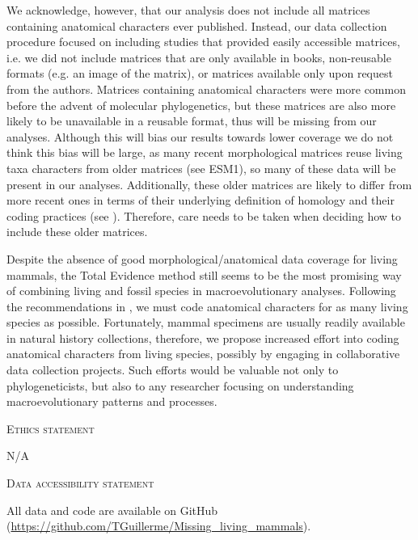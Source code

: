 \documentclass[12pt,letterpaper]{article}
\renewcommand{\section}[1]{%
\bigskip
\begin{center}
\begin{Large}
\normalfont\scshape #1
\medskip
\end{Large}
\end{center}}
\begin{document}
We acknowledge, however, that our analysis does not include all matrices containing anatomical characters ever published.
Instead, our data collection procedure focused on including studies that provided easily accessible matrices, i.e. we did not include matrices that are only available in books, non-reusable formats (e.g. an image of the matrix), or matrices available only upon request from the authors.
Matrices containing anatomical characters were more common before the advent of molecular phylogenetics, but these matrices are also more likely to be unavailable in a reusable format, thus will be missing from our analyses.
Although this will bias our results towards lower coverage we do not think this bias will be large, as many recent morphological matrices reuse living taxa characters from older matrices (see ESM1), so many of these data will be present in our analyses.
Additionally, these older matrices are likely to differ from more recent ones in terms of their underlying definition of homology and their coding practices (see \cite{Brazeau2011}).
Therefore, care needs to be taken when deciding how to include these older matrices.

Despite the absence of good morphological/anatomical data coverage for living mammals, the Total Evidence method still seems to be the most promising way of combining living and fossil species in macroevolutionary analyses.
Following the recommendations in \cite{GuillermeCooper}, we must code anatomical characters for as many living species as possible. 
Fortunately, mammal specimens are usually readily available in natural history collections, therefore, we propose increased effort into coding anatomical characters from living species, possibly by engaging in collaborative data collection projects.
Such efforts would be valuable not only to phylogeneticists, but also to any researcher focusing on understanding macroevolutionary patterns and processes.

\section{Ethics statement}
N/A
\section{Data accessibility statement}
All data and code are available on GitHub (\url{https://github.com/TGuillerme/Missing_living_mammals}).
\end{document}
